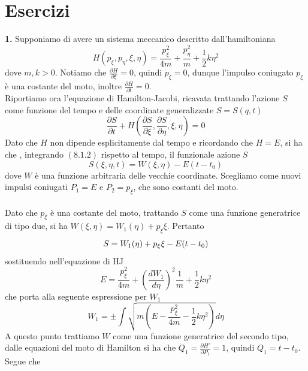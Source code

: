\documentclass{article}
\begin{document}
\section{Esercizi}
\textbf{1.} Supponiamo di avere un sistema meccanico descritto dall'hamiltoniana
\begin{equation}
    H(p_{\xi}, p_{\eta}, \xi, \eta) = \frac{p^2_{\xi}}{4m} + \frac{p^2_{\eta}}{m} + \frac{1}{2}k\eta^2 \tag{8.1.1}
\end{equation}
dove $m, k > 0$. Notiamo che $\frac{\partial H}{\partial \xi} = 0$, quindi $\dot{p}_\xi = 0$, dunque l'impulso coniugato $p_{\xi}$ è una costante del moto, inoltre $\frac{\partial H}{\partial t} = 0$. \\
Riportiamo ora l'equazione di Hamilton-Jacobi, ricavata trattando l'azione $S$ come funzione del tempo e delle coordinate generalizzate $S = S(q, t)$
\begin{equation}
    \frac{\partial S}{\partial t} + H\left(\frac{\partial S}{\partial \xi}, \frac{\partial S}{\partial \eta}, \xi, \eta\right) = 0 \tag{8.1.2} 
\end{equation}
Dato che $H$ non dipende esplicitamente dal tempo e ricordando che $H = E$, si ha che , integrando $(8.1.2)$ rispetto al tempo, il funzionale azione $S$
\begin{equation}
    S(\xi, \eta, t) = W(\xi, \eta) - E(t - t_0) \tag{8.1.3}
\end{equation}
dove $W$ è una funzione arbitraria delle vecchie coordinate. Scegliamo come nuovi impulsi coniugati $P_1 = E$ e $P_2 = p_\xi$, che sono costanti del moto. \\ \\
Dato che $p_\xi$ è una costante del moto, trattando $S$ come una funzione generatrice di tipo due, si ha $W(\xi, \eta) = W_1(\eta) + p_\xi \xi$. Pertanto
\begin{equation}
    S = W_1(\eta) + p_\xi \xi - E(t - t_0) \notag
\end{equation}
sostituendo nell'equazione di HJ
\begin{equation}
    E = \frac{p^2_\xi}{4m} + \left(\frac{dW_1}{d\eta}\right)^2 \frac{1}{m} + \frac{1}{2}k\eta^2 \tag{8.1.4}
\end{equation}
che porta alla seguente espressione per $W_1$
\begin{equation}
    W_1 = \pm \int \sqrt{m\left( E - \frac{p^2_\xi}{4m} - \frac{1}{2}k\eta^2\right)}d\eta \tag{8.1.5}
\end{equation}
A questo punto trattiamo $W$ come una funzione generatrice del secondo tipo, dalle equazioni del moto di Hamilton si ha che $\dot{Q}_1 = \frac{\partial H'}{\partial P_1} = 1$, quindi $Q_1 = t - t_0$. Segue che
\end{document}
